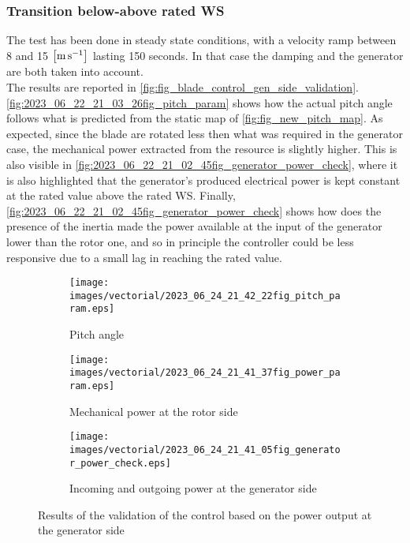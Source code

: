 \subsubsection{Transition below-above rated WS}
The test has been done in steady state conditions, with a velocity ramp between 8 and 15 $\left[\si{\meter\per\second}\right]$ lasting 150 seconds. In that case the damping and the generator are both taken into account.\\
The results are reported in \autoref{fig:fig_blade_control_gen_side_validation}. \autoref{fig:2023_06_22_21_03_26fig_pitch_param} shows how the actual pitch angle follows what is predicted from the static map of \autoref{fig:fig_new_pitch_map}. As expected, since the blade are rotated less then what was required in the generator case, the mechanical power extracted from the resource is slightly higher. This is also visible in \autoref{fig:2023_06_22_21_02_45fig_generator_power_check}, where it is also highlighted that the generator's produced electrical power is kept constant at the rated value above the rated WS. Finally, \autoref{fig:2023_06_22_21_02_45fig_generator_power_check} shows how does the presence of the inertia made the power available at the input of the generator lower than the rotor one, and so in principle the controller could be less responsive due to a small lag in reaching the rated value. 
\begin{figure}[htb]
  \begin{subfigure}{0.5\textwidth}
    \centering
    \texttt{[image: images/vectorial/2023\_06\_24\_21\_42\_22fig\_pitch\_param.eps]}
    \caption{Pitch angle}
    \label{fig:2023_06_22_21_03_26fig_pitch_param}
  \end{subfigure}
  \begin{subfigure}{0.5\textwidth}
    \centering
    \texttt{[image: images/vectorial/2023\_06\_24\_21\_41\_37fig\_power\_param.eps]}
    \caption{Mechanical power at the rotor side}
    \label{fig:2023_06_22_21_03_05fig_power_param}
  \end{subfigure}
  \begin{subfigure}{0.5\textwidth}
    \centering
    \texttt{[image: images/vectorial/2023\_06\_24\_21\_41\_05fig\_generator\_power\_check.eps]}
    \caption{Incoming and outgoing power at the generator side}
    \label{fig:2023_06_22_21_02_45fig_generator_power_check}
  \end{subfigure}
  \caption{Results of the validation of the control based on the power output at the generator side}
  \label{fig:fig_blade_control_gen_side_validation}
\end{figure}
\newpage